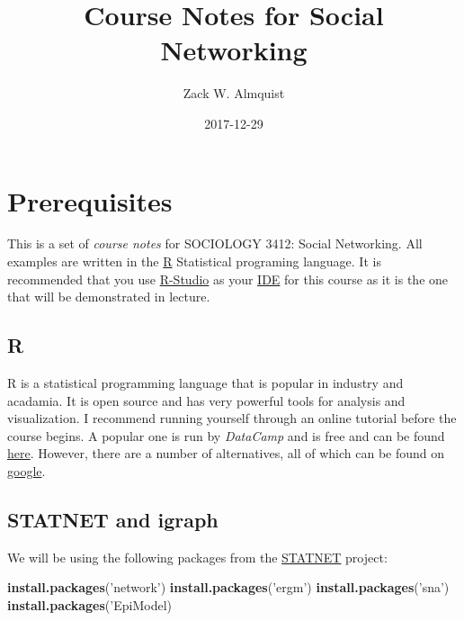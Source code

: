\documentclass[]{book}
\title{Course Notes for Social Networking}
\author{Zack W. Almquist}
\date{2017-12-29}
\newenvironment{Shaded}{\begin{snugshade}}{\end{snugshade}}
\newcommand{\KeywordTok}[1]{\textcolor[rgb]{0.13,0.29,0.53}{\textbf{{#1}}}}
\newcommand{\StringTok}[1]{\textcolor[rgb]{0.31,0.60,0.02}{{#1}}}
\newcommand{\NormalTok}[1]{{#1}}
\theoremstyle{definition}
\theoremstyle{definition}
\theoremstyle{definition}
\theoremstyle{remark}
\begin{document}
\maketitle

{
\setcounter{tocdepth}{1}
\tableofcontents
}
\chapter{Prerequisites}\label{prerequisites}

This is a set of \emph{course notes} for SOCIOLOGY 3412: Social
Networking. All examples are written in the
\href{https://www.r-project.org/}{R} Statistical programing language. It
is recommended that you use \href{https://www.rstudio.com/}{R-Studio} as
your
\href{https://en.wikipedia.org/wiki/Integrated_development_environment}{IDE}
for this course as it is the one that will be demonstrated in lecture.

\section{R}\label{r}

R is a statistical programming language that is popular in industry and
acadamia. It is open source and has very powerful tools for analysis and
visualization. I recommend running yourself through an online tutorial
before the course begins. A popular one is run by \emph{DataCamp} and is
free and can be found
\href{https://www.datacamp.com/courses/free-introduction-to-r}{here}.
However, there are a number of alternatives, all of which can be found
on \href{http://www.letmegooglethat.com/?q=introduction+to+R}{google}.

\section{STATNET and igraph}\label{statnet-and-igraph}

We will be using the following packages from the
\href{https://statnet.org/}{STATNET} project:

\begin{Shaded}
\begin{Highlighting}[]
\KeywordTok{install.packages}\NormalTok{(}\StringTok{'network'}\NormalTok{)}
\KeywordTok{install.packages}\NormalTok{(}\StringTok{'ergm'}\NormalTok{)}
\KeywordTok{install.packages}\NormalTok{(}\StringTok{'sna'}\NormalTok{)}
\KeywordTok{install.packages}\NormalTok{(}\StringTok{'EpiModel)}
\end{Highlighting}
\end{Shaded}
\end{document}
